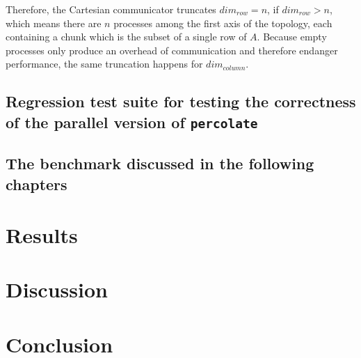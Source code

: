 \documentclass[twoside,11pt]{article}
\def\perc{\texttt{perco\-late}}
\begin{document}
Therefore, the Cartesian communicator truncates
$dim_{row} = n$, if $dim_{row} > n$, which means there are
$n$ processes among the first axis of the topology, each
containing a chunk which is the subset of a single row of
$A$.
Because empty processes only produce an overhead of
communication and therefore endanger performance, the same
truncation happens for $dim_{column}$.



\subsection{Regression test suite for testing the
  correctness of the parallel version of \perc{}}




\subsection{The benchmark discussed in the following
  chapters}




\section{Results} %





\section{Discussion} %


\section{Conclusion} %



\end{document}
